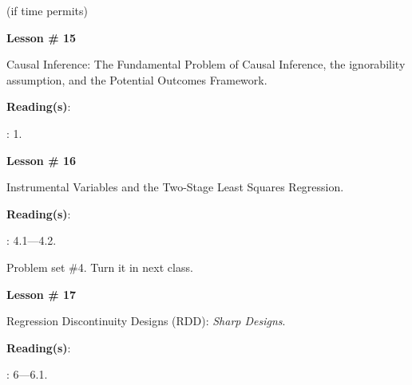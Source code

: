 \documentclass[letterpaper]{article}
\renewenvironment{itemize}{
  \begin{list}{}{
    \setlength{\leftmargin}{1.5em}
  }
}{
  \end{list}
}
\begin{document}
\begin{enumerate}
  \item {} (if time permits)


      \begin{itemize} 
        \item[$\bullet$] {\bf Lesson \# 15} %
          \begin{itemize} 
            \item[$\circ$] Causal Inference: The Fundamental Problem of Causal Inference, the ignorability assumption, and the Potential Outcomes Framework.
            \item[$\circ$] {\bf Reading(s)}: 
              \begin{itemize}
                \item[$\diamond$] \textcite{Imbens2015}: 1.
              \end{itemize}
          \end{itemize}
      \end{itemize}





      \begin{itemize} 
        \item[$\bullet$] {\bf Lesson \# 16} %
          \begin{itemize} 
            \item[$\circ$] Instrumental Variables and the Two-Stage Least Squares Regression.
            \item[$\circ$] {\bf Reading(s)}: 
              \begin{itemize}
                \item[$\diamond$] \textcite{Angrist2009}: 4.1---4.2.
              \end{itemize}
          \end{itemize}
      \end{itemize}


\item[{\color{red}\Pointinghand}] Problem set \#4. Turn it in next class.


      \begin{itemize} 
        \item[$\bullet$] {\bf Lesson \# 17} %
          \begin{itemize} 
            \item[$\circ$] Regression Discontinuity Designs (RDD): \emph{Sharp Designs}.
            \item[$\circ$] {\bf Reading(s)}: 
              \begin{itemize}
                \item[$\diamond$] \textcite{Angrist2009}: 6---6.1.
              \end{itemize}
          \end{itemize}
      \end{itemize}



\end{enumerate}
\end{document}
